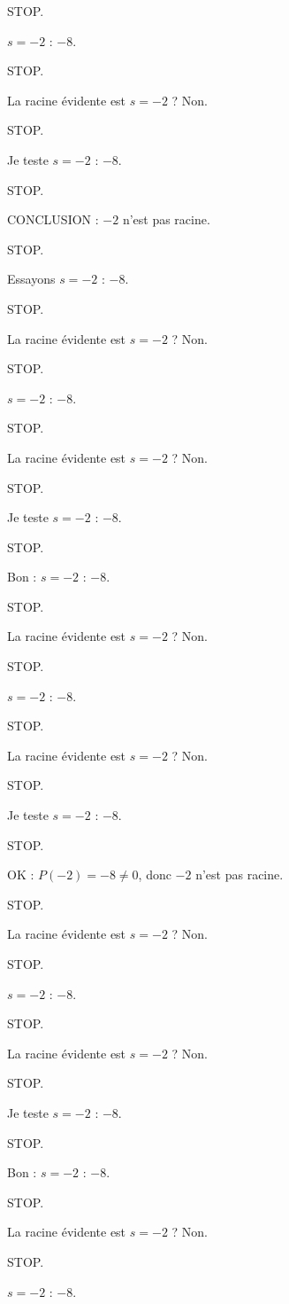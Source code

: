 \documentclass[11pt]{article}
\begin{document}
\begin{exoresolu}
\begin{enumerate}
STOP. 

$s = -2$ : $-8$. 

STOP. 

La racine évidente est $s = -2$ ? Non. 

STOP. 

Je teste $s = -2$ : $-8$. 

STOP. 

CONCLUSION : $-2$ n'est pas racine. 

STOP. 

Essayons $s = -2$ : $-8$. 

STOP. 

La racine évidente est $s = -2$ ? Non. 

STOP. 

$s = -2$ : $-8$. 

STOP. 

La racine évidente est $s = -2$ ? Non. 

STOP. 

Je teste $s = -2$ : $-8$. 

STOP. 

Bon : $s = -2$ : $-8$. 

STOP. 

La racine évidente est $s = -2$ ? Non. 

STOP. 

$s = -2$ : $-8$. 

STOP. 

La racine évidente est $s = -2$ ? Non. 

STOP. 

Je teste $s = -2$ : $-8$. 

STOP. 

OK : $P(-2) = -8 \neq 0$, donc $-2$ n'est pas racine. 

STOP. 

La racine évidente est $s = -2$ ? Non. 

STOP. 

$s = -2$ : $-8$. 

STOP. 

La racine évidente est $s = -2$ ? Non. 

STOP. 

Je teste $s = -2$ : $-8$. 

STOP. 

Bon : $s = -2$ : $-8$. 

STOP. 

La racine évidente est $s = -2$ ? Non. 

STOP. 

$s = -2$ : $-8$. 


\end{enumerate}
\end{exoresolu}
\end{document}
